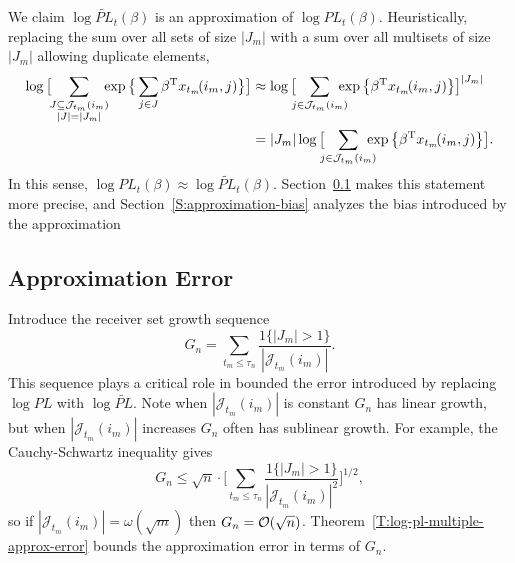\documentclass[aoas,preprint]{imsart}
\begin{document}
We claim $\log \widetilde{\mathit{PL}}_t(\beta)$ is an approximation of
$\log \mathit{PL}_t(\beta)$.  Heuristically, replacing the
sum over all sets of size $|J_m|$ with a sum over all multisets of size
$|J_m|$ allowing duplicate elements,
\begin{align*}
    \log\big[\!\!
        \sum_{\substack{J \subseteq \mathcal{J}_{t_m}(i_m) \\
              |J| = |J_m|}}\!\!\!
            \exp\big\{
                \sum_{j \in J}
                    \beta^\trans x_{t_m}\!(i_m, j)
            \big\}
    \big]
    &\approx
        \log\big[\!\!\!
            \sum_{j \in \mathcal{J}_{t_m}(i_m)}\!\!\!\!\!
                \exp\big\{
                    \beta^\trans x_{t_m}\!(i_m, j)
                \big\}
        \big]^{|J_m|} \\
    &=
        |J_m|
        \log\big[\!\!\!
            \sum_{j \in \mathcal{J}_{t_m}(i_m)}\!\!\!\!\!
                \exp\big\{
                    \beta^\trans x_{t_m}\!(i_m, j)
                \big\}
        \big].
\end{align*}
In this sense,
$\log \mathit{PL}_t(\beta) \approx \log \widetilde{\mathit{PL}}_t(\beta)$.
Section~\ref{S:approximation-error} makes this statement more precise,
and Section~\ref{S:approximation-bias} analyzes the bias introduced by the approximation

\subsection{Approximation Error}\label{S:approximation-error}
Introduce the receiver set growth sequence
\begin{equation}\label{E:growth-constant}
    G_n
        =
            \sum_{t_m \leq \tau_n}
                \frac{1\{|J_m| > 1\}}{|\mathcal{J}_{t_m}(i_m)|}.
\end{equation}
This sequence plays a critical role in bounded the error introduced by
replacing $\log \mathit{PL}$ with $\log \widetilde{\mathit{PL}}$.
Note when $|\mathcal{J}_{t_m}(i_m)|$ is constant $G_n$ has linear growth,
but when $|\mathcal{J}_{t_m}(i_m)|$ increases $G_n$ often has sublinear 
growth.  For example, the Cauchy-Schwartz inequality gives
\[
    G_n
        \leq
            \sqrt{n}
            \cdot
            \bigg[
                \sum_{t_m \leq \tau_n}
                    \frac{1\{|J_m| > 1\}}{|\mathcal{J}_{t_m}(i_m)|^2}
            \bigg]^{1/2},
\]
so if $|\mathcal{J}_{t_m}(i_m)| = \omega(\sqrt{m})$ then
$G_n = \mathcal{O}(\sqrt{n})$.  Theorem~\ref{T:log-pl-multiple-approx-error} bounds
the approximation error in terms of $G_n$.
\end{document}
